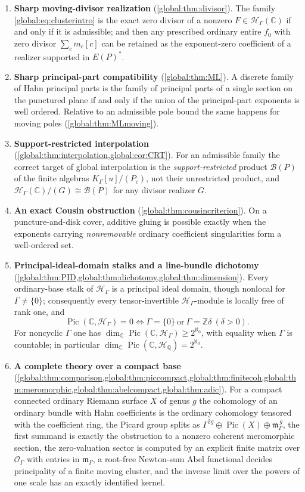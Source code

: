 \documentclass[11pt,letterpaper]{article}
\theoremstyle{definition}
\theoremstyle{remark}
\newcommand{\C}{\mathbb C}
\newcommand{\Z}{\mathbb Z}
\newcommand{\Q}{\mathbb Q}
\newcommand{\OO}{\mathcal O}
\newcommand{\HH}{\mathscr H_\Gamma}
\newcommand{\KK}{K_\Gamma}
\newcommand{\mK}{\mathfrak m_\Gamma}
\newcommand{\Pic}{\operatorname{Pic}}
\newcommand{\BB}{\mathscr B(P)}
\numberwithin{equation}{section}
\begin{document}
\begin{enumerate}
\item \textbf{Sharp moving-divisor realization} (\cref{global:thm:divisor}). The family \eqref{global:eq:clusterintro} is the exact zero divisor of a nonzero $F\in\HH(\C)$ if and only if it is admissible; and then any prescribed ordinary entire $f_0$ with zero divisor $\sum_c m_c[c]$ can be retained as the exponent-zero coefficient of a realizer supported in $E(P)^*$.
\item \textbf{Sharp principal-part compatibility} (\cref{global:thm:ML}). A discrete family of Hahn principal parts is the family of principal parts of a single section on the punctured plane if and only if the union of the principal-part exponents is well ordered. Relative to an admissible pole bound the same happens for moving poles (\cref{global:thm:MLmoving}).
\item \textbf{Support-restricted interpolation} (\cref{global:thm:interpolation,global:cor:CRT}). For an admissible family the correct target of global interpolation is the \emph{support-restricted} product $\BB$ of the finite algebras $\KK[u]/(P_c)$, not their unrestricted product, and $\HH(\C)/(G)\cong\BB$ for any divisor realizer $G$.
\item \textbf{An exact Cousin obstruction} (\cref{global:thm:cousincriterion}). On a puncture-and-disk cover, additive gluing is possible exactly when the exponents carrying \emph{nonremovable} ordinary coefficient singularities form a well-ordered set.
\item \textbf{Principal-ideal-domain stalks and a line-bundle dichotomy} (\cref{global:thm:PID,global:thm:dichotomy,global:thm:dimension}). Every ordinary-base stalk of $\HH$ is a principal ideal domain, though nonlocal for $\Gamma\ne\{0\}$; consequently every tensor-invertible $\HH$-module is locally free of rank one, and
\[
  \Pic(\C,\HH)=0
  \iff \Gamma=\{0\}\ \text{or}\ \Gamma=\Z\delta\ (\delta>0).
\]
For noncyclic $\Gamma$ one has $\dim_\C\Pic(\C,\HH)\ge2^{\aleph_0}$, with equality when $\Gamma$ is countable; in particular $\dim_\C\Pic(\C,\mathscr H_\Q)=2^{\aleph_0}$.
\item \textbf{A complete theory over a compact base} (\cref{global:thm:comparison,global:thm:piccompact,global:thm:finitecoh,global:thm:meromorphic,global:thm:abelcompact,global:thm:adic}). For a compact connected ordinary Riemann surface $X$ of genus $g$ the cohomology of an ordinary bundle with Hahn coefficients is the ordinary cohomology tensored with the coefficient ring, the Picard group splits as $\Gamma^{2g}\oplus\Pic(X)\oplus\mK^{\,g}$, the first summand is exactly the obstruction to a nonzero coherent meromorphic section, the zero-valuation sector is computed by an explicit finite matrix over $\OO_\Gamma$ with entries in $\mK$, a root-free Newton-sum Abel functional decides principality of a finite moving cluster, and the inverse limit over the powers of one scale has an exactly identified kernel.
\end{enumerate}
\end{document}
